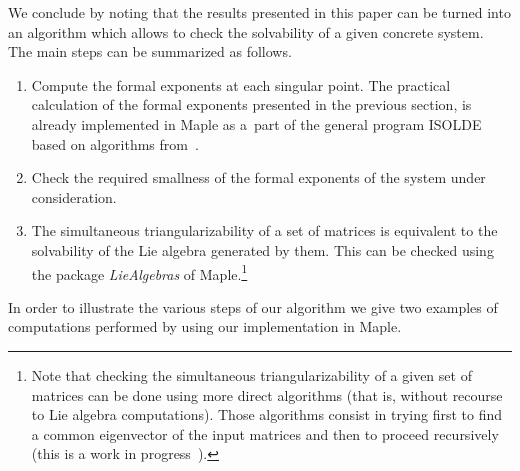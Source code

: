 \documentclass[pdftex]{sigma}
\numberwithin{equation}{section}
\begin{document}
We conclude by noting that the results presented in this paper can be turned into an algorithm which allows to check the solvability of a given concrete system. The main steps can be summarized as follows.
\begin{enumerate}	\itemsep=0pt
	\item Compute the formal exponents at each singular point. 	The practical calculation of the formal exponents presented in the previous section, is already implemented in Maple as a~part of the general program ISOLDE \cite{BP} based on algorithms from~\cite{Ba}.
	\item Check the required smallness of the formal exponents of the system under consideration.
	\item The simultaneous triangularizability of a set of matrices is equivalent to the solvability of the Lie algebra generated by them. This can be checked using the package {\it LieAlgebras} of Maple.\footnote{Note that checking the simultaneous triangularizability of a given set of matrices can be done using more direct algorithms (that is, without recourse to Lie algebra computations). Those algorithms consist in trying first to find a common eigenvector of the input matrices and then to proceed recursively (this is a work in progress~\cite{BC}).}
\end{enumerate}

In order to illustrate the various steps of our algorithm we give two examples of computations performed by using our implementation in Maple.
\end{document}
